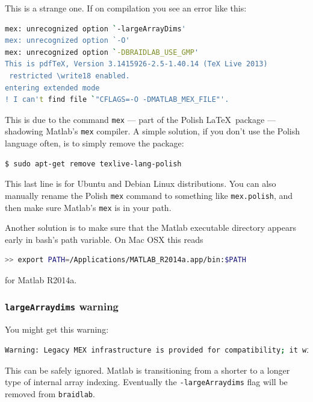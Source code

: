 \documentclass[12pt]{article}
\newcommand{\braidlab}{\texttt{braidlab}}%
\begin{document}
This is a strange one.  If on compilation you see an error like this:
\begin{lstlisting}[frame=single,framerule=0pt,escapechar=*,%
  language=bash,backgroundcolor=\color{white}]
mex: unrecognized option `-largeArrayDims'
mex: unrecognized option `-O'
mex: unrecognized option `-DBRAIDLAB_USE_GMP'
This is pdfTeX, Version 3.1415926-2.5-1.40.14 (TeX Live 2013)
 restricted \write18 enabled.
entering extended mode
! I can't find file `"CFLAGS=-O -DMATLAB_MEX_FILE"'.
\end{lstlisting}
This is due to the command \lstinline{mex} --- part of the Polish \LaTeX\
package --- shadowing Matlab's \lstinline{mex} compiler.  A simple solution,
if you don't use the Polish language often, is to simply remove the package:
\begin{lstlisting}[frame=single,framerule=0pt,escapechar=*,%
  language=bash,backgroundcolor=\color{white}]
$ sudo apt-get remove texlive-lang-polish
\end{lstlisting}
This last line is for Ubuntu and Debian Linux distributions.  You can also
manually rename the Polish \lstinline{mex} command to something like
\lstinline{mex.polish}, and then make sure Matlab's \lstinline{mex} is in your
path.

Another solution is to make sure that the Matlab executable directory appears
early in bash's path variable.  On Mac OSX this reads
\begin{lstlisting}[frame=single,framerule=0pt,escapechar=*,%
  language=bash,backgroundcolor=\color{white}]
>> export PATH=/Applications/MATLAB_R2014a.app/bin:$PATH
\end{lstlisting}
for Matlab R2014a.


\subsubsection{\lstinline{largeArraydims} warning}

You might get this warning:
\begin{lstlisting}[frame=single,framerule=0pt,escapechar=*,%
  language=bash,backgroundcolor=\color{white}]
Warning: Legacy MEX infrastructure is provided for compatibility; it will be removed in a future version of MATLAB.
\end{lstlisting}
This can be safely ignored.  Matlab is transitioning from a shorter to a
longer type of internal array indexing.  Eventually the
\lstinline{-largeArraydims} flag will be removed from \braidlab.

\index{installing \braidlab!troubleshooting|)}


{\small

}

% 

%

\clearpage
{}
\printindex
\end{document}
